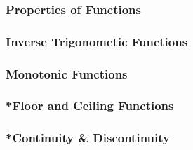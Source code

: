\documentclass[../main.tex]{subfiles}
\begin{document}
\subsubsection{Properties of Functions}

\subsubsection{Inverse Trigonometic Functions}

\subsubsection{Monotonic Functions}

\subsubsection{*Floor and Ceiling Functions}

\subsubsection{*Continuity \& Discontinuity}
\end{document}
